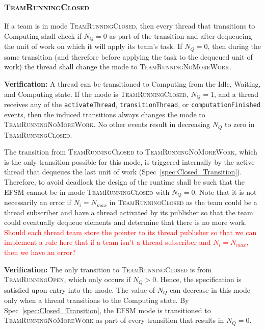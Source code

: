 \documentclass{article}
\newcommand{\TeamRunningOpen}   {\textsc{TeamRunningOpen}}
\newcommand{\TeamRunningClosed} {\textsc{TeamRunningClosed}}
\newcommand{\TeamRunningNoMoreWork} {\textsc{TeamRunningNoMoreWork}}
\begin{document}
\subsubsection{\TeamRunningClosed}
\begin{spec}
\label{spec:Closed_Transition}
If a team is in mode \TeamRunningClosed, then every thread that transitions to
Computing shall check if $N_Q = 0$ as part of the transition and after
dequeueing the unit of work on which it will apply its team's task.  If $N_Q =
0$, then during the same transition (and therefore before applying the task to
the dequeued unit of work) the thread shall change the mode to
\TeamRunningNoMoreWork.
\end{spec}
\textbf{Verification:}\hspace{0.125in}  A thread can be transitioned to
Computing from the Idle, Waiting, and Computing state.  If the mode is
{\TeamRunningClosed}, $N_Q = 1$, and a
thread receives any of the \texttt{activateThread}, \texttt{transitionThread},
or \texttt{computationFinished} events, then the induced transitions always changes
the mode to \TeamRunningNoMoreWork.  No other events result in decreasing $N_Q$
to zero in \TeamRunningClosed.

\begin{spec}
\label{spec:Closed_NoWork}
The transition from {\TeamRunningClosed} to \TeamRunningNoMoreWork, which is the
only transition possible for this mode, is triggered internally by the active
thread that dequeues the last unit of work (Spec~\ref{spec:Closed_Transition}).
Therefore, to avoid deadlock the design of the runtime shall be such that the
EFSM cannot be in mode {\TeamRunningClosed} with $N_Q = 0$.  Note that it is not
necessarily an error if $N_i = N_{max}$ in {\TeamRunningClosed} as the team
could be a thread subscriber and have a thread activated by its publisher so
that the team could eventually dequeue elements and determine that there is no
more work.
\textcolor{red}{Should each thread team store the pointer to its thread
publisher so that we can implement a rule here that if a team isn't a thread
subscriber and $N_i = N_{max}$, then we have an error?}
\end{spec}
\textbf{Verification:}\hspace{0.125in}  The only transition to
{\TeamRunningClosed} is from {\TeamRunningOpen}, which only occurs if $N_Q > 0$.
Hence, the specification is satisfied upon entry into the mode.  The value of
$N_Q$ can decrease in this mode only when a thread transitions to the Computing
state.   By Spec~\ref{spec:Closed_Transition}, the EFSM mode is transitioned to
{\TeamRunningNoMoreWork} as part of every transition that results in $N_Q = 0$.
\end{document}

